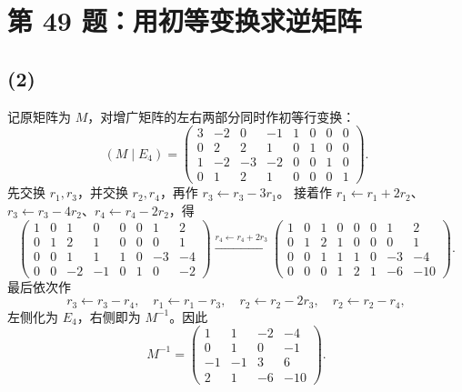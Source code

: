 \documentclass[11pt,a4paper,fontset=fandol]{ctexart}
\newcommand{\ans}[1]{\boxed{#1}}
\newcommand{\problem}[1]{\Needspace{8\baselineskip}\section*{#1}}
\newcommand{\parttitle}[1]{\Needspace{7\baselineskip}\subsection*{#1}}
\begin{document}
\problem{第 49 题：用初等变换求逆矩阵}
\parttitle{(2)}
记原矩阵为 $M$，对增广矩阵的左右两部分同时作初等行变换：
\[
(M\mid E_4)=\left(\begin{array}{rrrr|rrrr}
3&-2&0&-1&1&0&0&0\\
0&2&2&1&0&1&0&0\\
1&-2&-3&-2&0&0&1&0\\
0&1&2&1&0&0&0&1
\end{array}\right).
\]
先交换 $r_1,r_3$，并交换 $r_2,r_4$，再作 $r_3\leftarrow r_3-3r_1$。
接着作 $r_1\leftarrow r_1+2r_2$、$r_3\leftarrow r_3-4r_2$、$r_4\leftarrow r_4-2r_2$，得
\[
\left(\begin{array}{rrrr|rrrr}
1&0&1&0&0&0&1&2\\
0&1&2&1&0&0&0&1\\
0&0&1&1&1&0&-3&-4\\
0&0&-2&-1&0&1&0&-2
\end{array}\right)
\xrightarrow{r_4\leftarrow r_4+2r_3}
\left(\begin{array}{rrrr|rrrr}
1&0&1&0&0&0&1&2\\
0&1&2&1&0&0&0&1\\
0&0&1&1&1&0&-3&-4\\
0&0&0&1&2&1&-6&-10
\end{array}\right).
\]
最后依次作
\[
r_3\leftarrow r_3-r_4,\quad
r_1\leftarrow r_1-r_3,\quad
r_2\leftarrow r_2-2r_3,\quad
r_2\leftarrow r_2-r_4,
\]
左侧化为 $E_4$，右侧即为 $M^{-1}$。因此
\[
\ans{M^{-1}=\begin{pmatrix}
1&1&-2&-4\\0&1&0&-1\\-1&-1&3&6\\2&1&-6&-10
\end{pmatrix}}.
\]

\newpage
\end{document}
